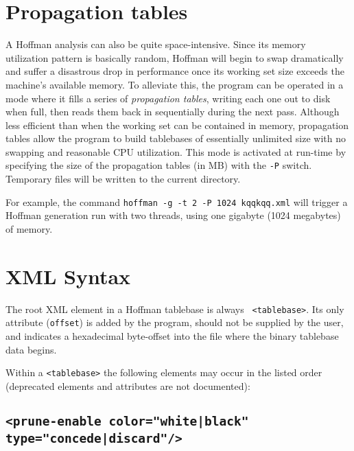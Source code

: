 \documentclass[11pt]{article}
\begin{document}

\section{Propagation tables}

A Hoffman analysis can also be quite space-intensive.  Since its
memory utilization pattern is basically random, Hoffman will begin to
swap dramatically and suffer a disastrous drop in performance once its
working set size exceeds the machine's available memory.  To alleviate
this, the program can be operated in a mode where it fills a series of
{\it propagation tables}, writing each one out to disk when full, then
reads them back in sequentially during the next pass.  Although less
efficient than when the working set can be contained in memory,
propagation tables allow the program to build tablebases of
essentially unlimited size with no swapping and reasonable CPU
utilization.  This mode is activated at run-time by specifying the
size of the propagation tables (in MB) with the {\tt -P} switch.
Temporary files will be written to the current directory.

For example, the command {\tt hoffman -g -t 2 -P 1024 kqqkqq.xml} will
trigger a Hoffman generation run with two threads, using one gigabyte
(1024 megabytes) of memory.

\vfil\eject
\section{XML Syntax}

The root XML element in a Hoffman tablebase is always {\tt
<tablebase>}.  Its only attribute ({\tt offset}) is added by the
program, should not be supplied by the user, and indicates a
hexadecimal byte-offset into the file where the binary tablebase data
begins.

Within a {\tt <tablebase>} the following elements may
occur in the listed order (deprecated elements and attributes are not
documented):

\subsection{\tt <prune-enable color="white|black" type="concede|discard"/>}
\end{document}
